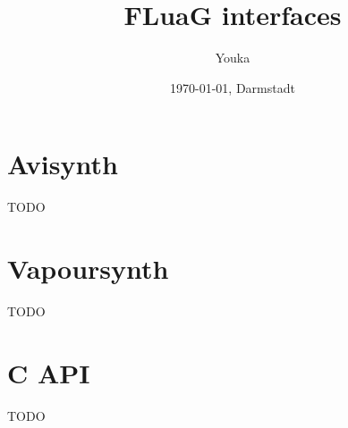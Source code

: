 \documentclass[12pt]{article}
\title{FLuaG interfaces}
\author{Youka}
\date{\today{}, Darmstadt}
\begin{document}
\maketitle
\tableofcontents

\section{Avisynth}
\label{sec:avisynth}

TODO

\section{Vapoursynth}
\label{sec:vapoursynth}

TODO

\section{C API}
\label{sec:c-api}

TODO
\end{document}

